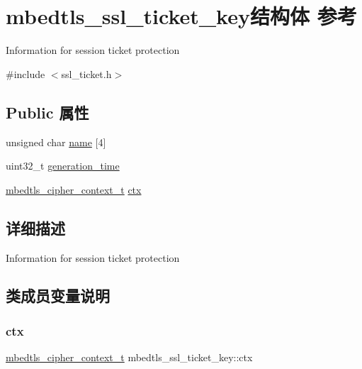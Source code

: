\hypertarget{structmbedtls__ssl__ticket__key}{}\section{mbedtls\+\_\+ssl\+\_\+ticket\+\_\+key结构体 参考}
\label{structmbedtls__ssl__ticket__key}


Information for session ticket protection  




{\ttfamily \#include $<$ssl\+\_\+ticket.\+h$>$}

\subsection*{Public 属性}
\begin{DoxyCompactItemize}
\item 
unsigned char \hyperlink{structmbedtls__ssl__ticket__key_a5c80ec11a07ab4e19e775f7586a11d21}{name} \mbox{[}4\mbox{]}
\item 
uint32\+\_\+t \hyperlink{structmbedtls__ssl__ticket__key_ada9d97d06d4c215e4810880427ca50ad}{generation\+\_\+time}
\item 
\hyperlink{structmbedtls__cipher__context__t}{mbedtls\+\_\+cipher\+\_\+context\+\_\+t} \hyperlink{structmbedtls__ssl__ticket__key_ad347a5aa480ee9df7f32c16d1bd56aae}{ctx}
\end{DoxyCompactItemize}


\subsection{详细描述}
Information for session ticket protection 

\subsection{类成员变量说明}
\mbox{\label{structmbedtls__ssl__ticket__key_ad347a5aa480ee9df7f32c16d1bd56aae}} 
\subsubsection{\texorpdfstring{ctx}{ctx}}
{\footnotesize\ttfamily \hyperlink{structmbedtls__cipher__context__t}{mbedtls\+\_\+cipher\+\_\+context\+\_\+t} mbedtls\+\_\+ssl\+\_\+ticket\+\_\+key\+::ctx}


